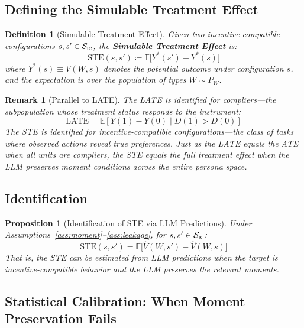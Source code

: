 \documentclass[12pt]{article}
\newtheorem{definition}{Definition}
\newtheorem{proposition}{Proposition}
\newtheorem{remark}{Remark}
\newcommand{\E}{\mathbb{E}}
\begin{document}
\subsection{Defining the Simulable Treatment Effect}

\begin{definition}[Simulable Treatment Effect]
\label{def:ste}
Given two incentive-compatible configurations $s, s' \in \mathcal{S}_{\textsc{ic}}$, the \textbf{Simulable Treatment Effect} is:
\begin{equation}
\boxed{
  \text{STE}(s, s') \coloneqq \E\bigl[Y^*(s') - Y^*(s)\bigr]
}
\end{equation}
where $Y^*(s) \equiv V(W, s)$ denotes the potential outcome under configuration $s$, and the expectation is over the population of types $W \sim P_W$.
\end{definition}

\begin{remark}[Parallel to LATE]
The LATE is identified for compliers---the subpopulation whose treatment status responds to the instrument:
\[
  \text{LATE} = \E[Y(1) - Y(0) \mid D(1) > D(0)]
\]
The STE is identified for incentive-compatible configurations---the class of tasks where observed actions reveal true preferences. Just as the LATE equals the ATE when all units are compliers, the STE equals the full treatment effect when the LLM preserves moment conditions across the entire persona space.
\end{remark}

\subsection{Identification}

\begin{proposition}[Identification of STE via LLM Predictions]
\label{prop:ident}
Under Assumptions~\ref{ass:moment}--\ref{ass:leakage}, for $s, s' \in \mathcal{S}_{\textsc{ic}}$:
\begin{equation}
  \text{STE}(s, s') = \E\bigl[\hat{V}(W, s') - \hat{V}(W, s)\bigr]
\end{equation}
That is, the STE can be estimated from LLM predictions when the target is incentive-compatible behavior and the LLM preserves the relevant moments.
\end{proposition}

\subsection{Statistical Calibration: When Moment Preservation Fails}
\end{document}
